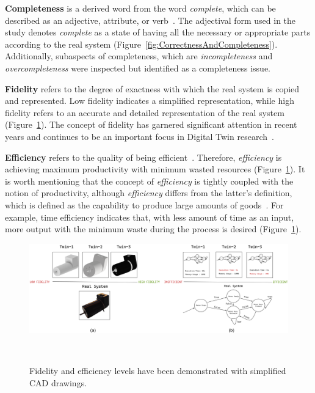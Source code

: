 \documentclass{llncs}
\begin{document}
    \textbf{Completeness} is a derived word from the word  \textit{complete}, which can be described as an adjective, attribute, or verb~\cite{OxfordDictionary}. 
    The adjectival form used in the study denotes \textit{complete} as a state of having all the necessary or appropriate parts according to the real system 
    (Figure~\ref{fig:CorrectnessAndCompleteness}). Additionally, subaspects of completeness, which are \textit{incompleteness} and \textit{overcompleteness} 
    were inspected but identified as a completeness issue.  

    \textbf{Fidelity} refers to the degree of exactness with which the real system is copied and represented. 
    Low fidelity indicates a simplified representation, 
    while high fidelity refers to an accurate and detailed representation of the real system~\cite{Review2} (Figure~\ref{fig:EfficiencyandFidelity}). 
    The concept of fidelity has garnered significant attention in recent
    years and continues to be an important focus in Digital Twin research~\cite{Review2,Review1}.

    \textbf{Efficiency} refers to the quality of being efficient~\cite{OxfordDictionary}. 
    Therefore, \textit{efficiency} is achieving maximum productivity with minimum wasted resources (Figure~\ref{fig:EfficiencyandFidelity}). 
    It is worth mentioning that the concept of \textit{efficiency} is tightly coupled with the notion of productivity, 
    although \textit{efficiency} differs from the latter's definition, which is defined as the capability to produce large amounts of goods~\cite{OxfordDictionary}.  
    For example, time efficiency indicates that,  with less amount of time as an input, more output with the minimum waste during the process is desired (Figure~\ref{fig:EfficiencyandFidelity}).
    \begin{figure}[htbp]
        \centering
        \includegraphics[width = 1\textwidth]{Efficiency and Fidelity.png}
        \caption{Fidelity and efficiency levels have been demonstrated with simplified CAD drawings.}~\label{fig:EfficiencyandFidelity}
    \end{figure}
\end{document}
